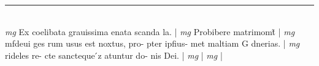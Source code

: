 \documentclass{article}
\begin{document}
\begin{pages}
\vspace{0.5cm}\noindent
\vspace{0.2cm}\rule{1cm}{0.2pt}\\ 
\hspace{0.2cm}\textit{mg}
\footnotesize Ex coelibata grauissima enata scanda la. 
\normalsize| 
\hspace{0.2cm}\textit{mg}
\footnotesize Probibere matrimomt̃ 
\normalsize| 
\hspace{0.2cm}\textit{mg}
\footnotesize mfdeui ges rum usus est noxtus, pro- pter ipfius- met maltiam G dnerias. 
\normalsize| 
\hspace{0.2cm}\textit{mg}
\footnotesize rideles re- cte sancteque ́z atuntur do- nis Dei. 
\normalsize| 
\hspace{0.2cm}\textit{mg}
\footnotesize 
\normalsize| 
\hspace{0.2cm}\textit{mg}
\footnotesize 
\normalsize| 

\end{pages}
\end{document}

